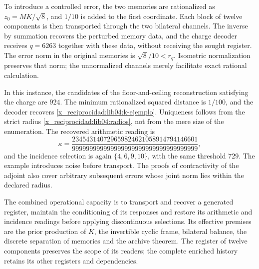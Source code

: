 To introduce a controlled error, the two memories are rationalized
as \(z_0=MK/\sqrt8\), and \(1/10\) is added to the first
coordinate. Each block of twelve components is then transported
through the two bilateral channels. The inverse by summation recovers the
perturbed memory data, and the charge decoder receives
\(q=6263\) together with these data, without receiving the sought register.
The error norm in the original memories is
\(\sqrt8/10<r_q\). Isometric normalization preserves that norm;
the unnormalized channels merely facilitate exact rational calculation.

In this instance, the candidates of the floor-and-ceiling reconstruction
satisfying the charge are \(924\). The minimum rationalized
squared distance is \(1/100\), and the decoder recovers
\eqref{x_reciprocidad:lib04:k-ejemplo}. Uniqueness follows from the strict radius
\eqref{x_reciprocidad:lib04:radios}, not from the mere size of the enumeration.
The recovered arithmetic reading is
\begin{equation}
 \kappa=
 \frac{234543140729659824621058914794146601}
      {999999999999999999999999999999999999},
 \label{x_reciprocidad:lib04:kappa-ejemplo}
\end{equation}
and the incidence selection is again \(\{4,6,9,10\}\), with
the same threshold \(729\). The example introduces noise before
transport. The proofs of contractivity of the adjoint also cover
arbitrary subsequent errors whose joint norm lies within the
declared radius.

The combined operational capacity is to transport and recover a generated
register, maintain the conditioning of its responses and restore
its arithmetic and incidence readings before applying discontinuous
selections. Its effective premises are the prior production of
\(K\), the invertible cyclic frame, bilateral balance, the
discrete separation of memories and the archive theorem. The
register of twelve components preserves the scope of its readers;
the complete enriched history retains its other registers and
dependencies.
